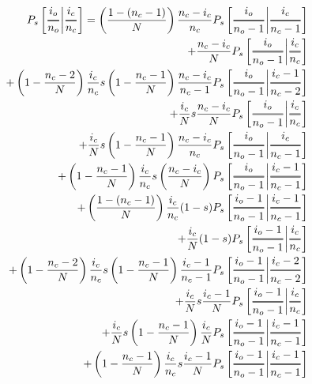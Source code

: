 \documentclass[preview]{standalone}
\newcommand{\Dfrac}[2]{%
  \ooalign{%
    $\genfrac{}{}{1.2pt}0{#1}{#2}$\cr%
    $\color{white}\genfrac{}{}{.4pt}0{\phantom{#1}}{\phantom{#2}}$}%
}
\newcommand{\cond}{\middle\vert}
\begin{document}
\begin{equation*}
  \begin{aligned}
    P_s\left[ \Dfrac{i_o}{n_o} \cond \Dfrac{i_c}{n_c} \right]
    = \left(\frac{1-(n_c-1)}{N}\right)\frac{n_c-i_c}{n_c} P_s\left[ \Dfrac{i_o}{n_o-1} \cond \Dfrac{i_c}{n_c-1} \right]& \\ %
    + \frac{n_c-i_c}{N} P_s\left[ \Dfrac{i_o}{n_o-1} \cond \Dfrac{i_c}{n_c} \right]& \\ %
    + \left(1-\frac{n_c-2}{N}\right) \frac{i_c}{n_c} s  \left(1-\frac{n_c-1}{N}\right) \frac{n_c-i_c}{n_c-1} P_s\left[ \Dfrac{i_o}{n_o-1} \cond \Dfrac{i_c-1}{n_c-2} \right]& \\ %
    + \frac{i_c}{N} s  \frac{n_c-i_c}{N}  P_s\left[ \Dfrac{i_o}{n_o-1} \cond \Dfrac{i_c}{n_c} \right] & \\ %
    + \frac{i_c}{N} s  \left(1-\frac{n_c-1}{N}\right) \frac{n_c-i_c}{n_c}  P_s\left[ \Dfrac{i_o}{n_o-1} \cond \Dfrac{i_c}{n_c-1} \right]& \\ %
    + \left(1-\frac{n_c-1}{N}\right) \frac{i_c}{n_c} s  \left(\frac{ n_c-i_c }{N}\right) P_s\left[ \Dfrac{i_o}{n_o-1} \cond \Dfrac{i_c-1}{n_c-1} \right]& \\ %
    + \left(\frac{1-(n_c-1)}{N}\right)\frac{i_c}{n_c} (1-s) P_s\left[ \Dfrac{i_o-1}{n_o-1} \cond \Dfrac{i_c-1}{n_c-1} \right]& \\ %
    + \frac{i_c}{N} (1-s) P_s\left[ \Dfrac{i_o-1}{n_o-1} \cond \Dfrac{i_c}{n_c} \right]& \\ %
    + \left(1-\frac{n_c-2}{N}\right) \frac{i_c}{n_c} s  \left(1-\frac{n_c-1}{N}\right) \frac{i_c-1}{n_c-1} P_s\left[ \Dfrac{i_o-1}{n_o-1} \cond \Dfrac{i_c-2}{n_c-2} \right]& \\ %
    + \frac{i_c}{N} s  \frac{i_c-1}{N}   P_s\left[ \Dfrac{i_o-1}{n_o-1} \cond \Dfrac{i_c}{n_c} \right]& \\ %
    + \frac{i_c}{N} s  \left(1-\frac{n_c-1}{N}\right) \frac{i_c}{N}   P_s\left[ \Dfrac{i_o-1}{n_o-1} \cond \Dfrac{i_c-1}{n_c-1} \right]& \\ %
    + \left(1-\frac{n_c-1}{N}\right) \frac{i_c}{n_c} s \frac{i_c-1}{N} P_s\left[ \Dfrac{i_o-1}{n_o-1} \cond \Dfrac{i_c-1}{n_c-1} \right] %
  \end{aligned}
\end{equation*}
\end{document}
